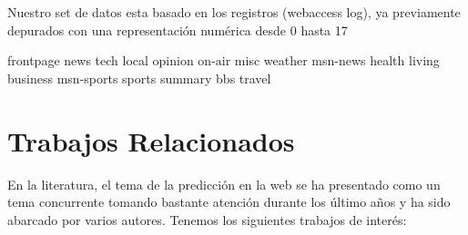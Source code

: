 	Nuestro set de  datos esta basado en los registros (webaccess log), ya previamente depurados con una representación numérica desde 0 hasta 17 

	frontpage news tech local opinion on-air misc weather msn-news health living business msn-sports sports summary bbs travel
















\section{Trabajos Relacionados}

En la literatura, el tema de la predicción en la web se ha presentado como un tema concurrente tomando bastante atención durante los último años y ha sido abarcado por 
varios autores. Tenemos los siguientes trabajos de interés:





